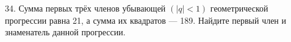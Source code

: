 34. Сумма первых трёх членов убывающей $(|q|<1)$ геометрической прогрессии равна 21, а сумма их квадратов --- 189. Найдите первый член и знаменатель данной прогрессии.\\

